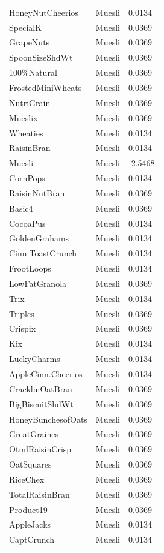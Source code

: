 \begin{table}[!htbp]
\begin{tabular}{lll}
HoneyNutCheerios & Muesli & 0.0134
\\
SpecialK & Muesli & 0.0369
\\
GrapeNuts & Muesli & 0.0369
\\
SpoonSizeShdWt & Muesli & 0.0369
\\
100\%Natural & Muesli & 0.0369
\\
FrostedMiniWheats & Muesli & 0.0369
\\
NutriGrain & Muesli & 0.0369
\\
Mueslix & Muesli & 0.0369
\\
Wheaties & Muesli & 0.0134
\\
RaisinBran & Muesli & 0.0134
\\
Muesli & Muesli & -2.5468
\\
CornPops & Muesli & 0.0134
\\
RaisinNutBran & Muesli & 0.0369
\\
Basic4 & Muesli & 0.0369
\\
CocoaPus & Muesli & 0.0134
\\
GoldenGrahams & Muesli & 0.0134
\\
Cinn.ToastCrunch & Muesli & 0.0134
\\
FrootLoops & Muesli & 0.0134
\\
LowFatGranola & Muesli & 0.0369
\\
Trix & Muesli & 0.0134
\\
Triples & Muesli & 0.0369
\\
Crispix & Muesli & 0.0369
\\
Kix & Muesli & 0.0134
\\
LuckyCharms & Muesli & 0.0134
\\
AppleCinn.Cheerios & Muesli & 0.0134
\\
CracklinOatBran & Muesli & 0.0369
\\
BigBiscuitShdWt & Muesli & 0.0369
\\
HoneyBunchesofOats & Muesli & 0.0369
\\
GreatGraines & Muesli & 0.0369
\\
OtmlRaisinCrisp & Muesli & 0.0369
\\
OatSquares & Muesli & 0.0369
\\
RiceChex & Muesli & 0.0369
\\
TotalRaisinBran & Muesli & 0.0369
\\
Product19 & Muesli & 0.0369
\\
AppleJacks & Muesli & 0.0134
\\
CaptCrunch & Muesli & 0.0134
\\

\end{tabular}
\end{table}
